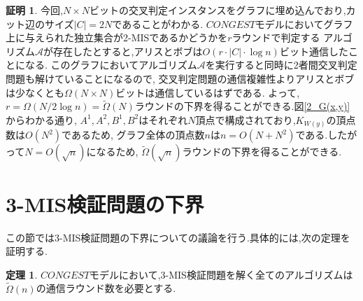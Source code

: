 \documentclass[12pt]{thesis}
\theoremstyle{definition}
\newtheorem{theorem}{定理}[chapter]
\newtheorem*{prf*}{証明}
\begin{document}
\begin{prf*}
今回,$N \times N$ビットの交叉判定インスタンスをグラフに埋め込んでおり,カット辺のサイズ$|C| = 2N$であることがわかる.
$CONGEST$モデルにおいてグラフ上に与えられた独立集合が2-MISであるかどうかを$r$ラウンドで判定する
アルゴリズム$\mathcal{A}$が存在したとすると,アリスとボブは$O(r \cdot |C| \cdot \log n)$ビット通信したことになる.
このグラフにおいてアルゴリズム$\mathcal{A}$を実行すると同時に2者間交叉判定問題も解けていることになるので,
交叉判定問題の通信複雑性よりアリスとボブは少なくとも$\Omega (N \times N)$ビットは通信しているはずである.
よって,$r = \Omega (N / 2\log n) = \tilde{\Omega}(N)$ラウンドの下界を得ることができる.図\ref{2_G(x,y)}からわかる通り,
$A^{1}, A^{2}, B^{1}, B^{2}$はそれぞれ$N$頂点で構成されており,$K_{W(y)}$の頂点数は$O(N^{2})$であるため,
グラフ全体の頂点数$n$は$n = O(N + N^{2})$である.したがって$N = O(\sqrt{n})$になるため,
$\tilde{\Omega}(\sqrt{n})$ラウンドの下界を得ることができる. 
\end{prf*}
\newpage

\section{3-MIS検証問題の下界}
この節では3-MIS検証問題の下界についての議論を行う.具体的には,次の定理を証明する.
\begin{theorem}
$CONGEST$モデルにおいて,3-MIS検証問題を解く全てのアルゴリズムは$\tilde{\Omega} (n)$の通信ラウンド数を必要とする.
\end{theorem}
\end{document}
